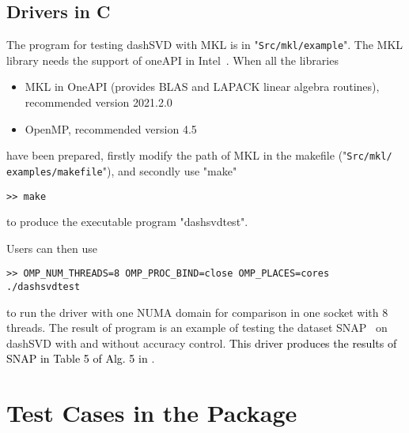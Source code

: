 \documentclass{ol-softwaremanual}
\newcommand{\notice}[1]{\textcolor{black}{#1}}
\begin{document}
\subsection{Drivers in C}

The program for testing dashSVD with MKL is in "\texttt{Src/mkl/example}". The MKL library needs the support of oneAPI in Intel~\cite{Intel}. When all the libraries
\begin{itemize}
\item MKL in OneAPI (provides BLAS and LAPACK linear algebra routines), recommended version 2021.2.0
\item OpenMP, recommended version 4.5
\end{itemize}
have been prepared, firstly modify the path of MKL in the makefile ("\texttt{Src/mkl/\\examples/makefile}"), and secondly use "make" 
\begin{lstlisting} 
>> make
\end{lstlisting}
to produce the executable program "dashsvdtest". 

Users can then use
\begin{lstlisting} 
>> OMP_NUM_THREADS=8 OMP_PROC_BIND=close OMP_PLACES=cores ./dashsvdtest
\end{lstlisting}
to run the driver with one NUMA domain for comparison in one socket with 8 threads. The result of program is an example of testing the dataset SNAP~\cite{snapnets} on dashSVD with and without accuracy control. \notice{This driver produces the results of SNAP in Table 5 of Alg. 5 in \cite{dashSVD}}.

\section{Test Cases in the Package}
\end{document}
